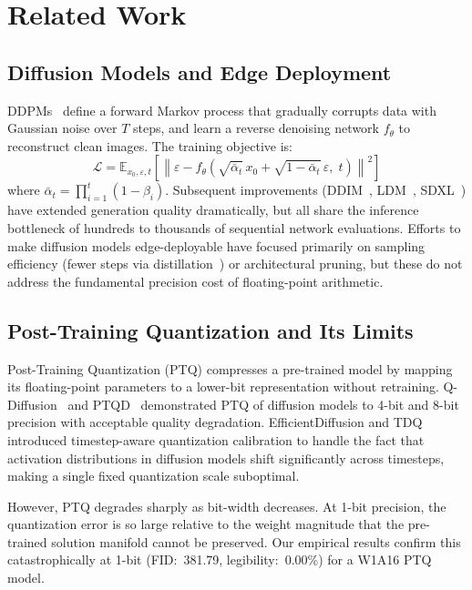 \documentclass[conference]{IEEEtran}
\begin{document}
\section{Related Work}

\subsection{Diffusion Models and Edge Deployment}

DDPMs~\cite{ho2020ddpm} define a forward Markov process that gradually corrupts data
with Gaussian noise over $T$ steps, and learn a reverse denoising network $f_\theta$ to
reconstruct clean images. The training objective is:
\begin{equation}
  \mathcal{L} = \mathbb{E}_{x_0,\varepsilon,t}\!\left[
    \left\|\varepsilon - f_\theta\!\left(\sqrt{\bar\alpha_t}\,x_0 +
    \sqrt{1-\bar\alpha_t}\,\varepsilon,\;t\right)\right\|^2\right]
  \label{eq:ddpm}
\end{equation}
where $\bar\alpha_t = \prod_{i=1}^{t}(1-\beta_i)$. Subsequent improvements
(DDIM~\cite{song2020ddim}, LDM~\cite{rombach2022ldm}, SDXL~\cite{podell2023sdxl}) have
extended generation quality dramatically, but all share the inference bottleneck of
hundreds to thousands of sequential network evaluations. Efforts to make diffusion models
edge-deployable have focused primarily on sampling efficiency (fewer steps via
distillation~\cite{salimans2022progressive}) or architectural pruning, but these do not
address the fundamental precision cost of floating-point arithmetic.

\subsection{Post-Training Quantization and Its Limits}

Post-Training Quantization (PTQ) compresses a pre-trained model by mapping its
floating-point parameters to a lower-bit representation without retraining.
Q-Diffusion~\cite{li2023qdiffusion} and PTQD~\cite{he2023ptqd} demonstrated PTQ of
diffusion models to 4-bit and 8-bit precision with acceptable quality degradation.
EfficientDiffusion and TDQ introduced timestep-aware quantization calibration to handle
the fact that activation distributions in diffusion models shift significantly across
timesteps, making a single fixed quantization scale suboptimal.

However, PTQ degrades sharply as bit-width decreases. At 1-bit precision, the
quantization error is so large relative to the weight magnitude that the pre-trained
solution manifold cannot be preserved. Our empirical results confirm this catastrophically
at 1-bit (FID:~381.79, legibility:~0.00\%) for a W1A16 PTQ model.
\end{document}
